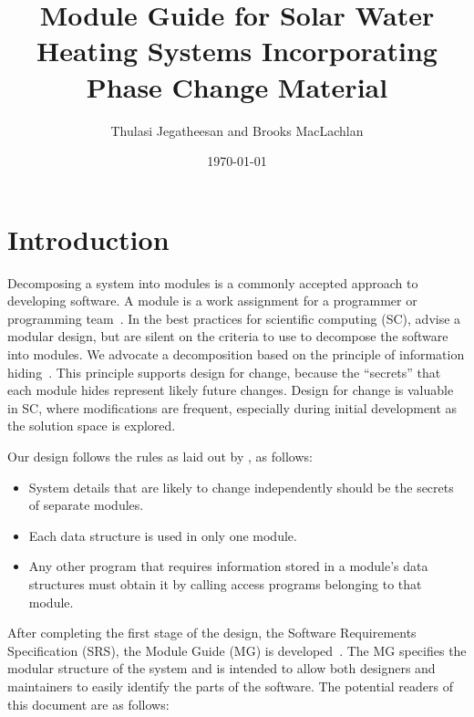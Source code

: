 \documentclass[12pt]{article}
\begin{document}
\title{Module Guide for Solar Water Heating Systems
  Incorporating Phase Change Material} 
\author{Thulasi Jegatheesan and Brooks MacLachlan}
\date{\today}
	
\maketitle

\tableofcontents

\newpage

\section{Introduction}

Decomposing a system into modules is a commonly accepted approach to developing
software.  A module is a work assignment for a programmer or programming
team~\citep{ParnasEtAl1984}.  In the best practices for scientific computing (SC),
\citet{WilsonEtAl2013} advise a modular design, but are silent on the criteria
to use to decompose the software into modules.  We advocate a decomposition
based on the principle of information hiding~\citep{Parnas1972a}.  This
principle supports design for change, because the ``secrets'' that each module
hides represent likely future changes.  Design for change is valuable in SC,
where modifications are frequent, especially during initial development as the
solution space is explored.  

Our design follows the rules as laid out by \citet{ParnasEtAl1984}, as follows:
\begin{itemize}
\item System details that are likely to change independently should be the
  secrets of separate modules.
\item Each data structure is used in only one module.
\item Any other program that requires information stored in a module's data
  structures must obtain it by calling access programs belonging to that module.
\end{itemize}

After completing the first stage of the design, the Software Requirements
Specification (SRS), the Module Guide (MG) is developed~\citep{ParnasEtAl1984}. The MG
specifies the modular structure of the system and is intended to allow both
designers and maintainers to easily identify the parts of the software.  The
potential readers of this document are as follows:
\end{document}
